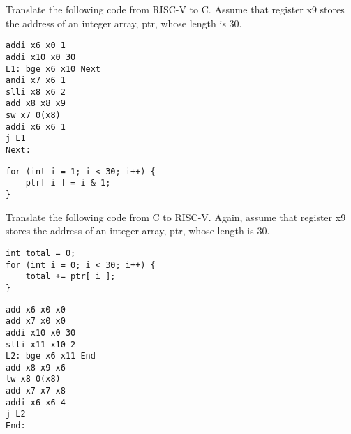 \begin{blocksection}
\question Translate the following code from RISC-V to C. Assume that register x9 stores the address of an integer array, ptr, whose length is 30.

\begin{verbatim}
addi x6 x0 1
addi x10 x0 30
L1: bge x6 x10 Next 
andi x7 x6 1 
slli x8 x6 2 
add x8 x8 x9 
sw x7 0(x8) 
addi x6 x6 1 
j L1
Next:
\end{verbatim}

\begin{solution}[0.5in]
\begin{verbatim}
for (int i = 1; i < 30; i++) { 
    ptr[ i ] = i & 1; 
}
\end{verbatim}
\end{solution}

\question Translate the following code from C to RISC-V. Again, assume that register x9 stores the address of an integer array, ptr, whose length is 30.

\begin{verbatim}
int total = 0;
for (int i = 0; i < 30; i++) { 
    total += ptr[ i ]; 
}
\end{verbatim}

\begin{solution}[1.5in]
\begin{verbatim}
add x6 x0 x0
add x7 x0 x0
addi x10 x0 30
slli x11 x10 2
L2: bge x6 x11 End 
add x8 x9 x6 
lw x8 0(x8) 
add x7 x7 x8 
addi x6 x6 4 
j L2
End:
\end{verbatim}
\end{solution}

\end{blocksection}